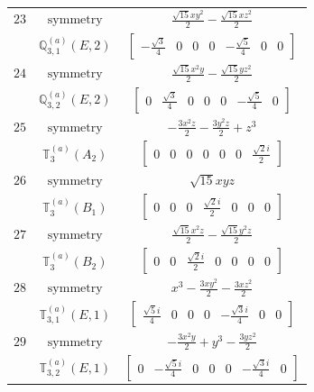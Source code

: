 \documentclass[fleqn,8pt,landscape]{jsarticle}
\begin{document}
\begin{longtable}{ccc}
$ 23 $ & $ \text{symmetry} $ & $ \frac{\sqrt{15} x y^{2}}{2} - \frac{\sqrt{15} x z^{2}}{2} $ \\
$  $ & $ \mathbb{Q}_{3,1}^{(a)}(E,2) $ & $ \begin{bmatrix} - \frac{\sqrt{3}}{4} & 0 & 0 & 0 & - \frac{\sqrt{5}}{4} & 0 & 0 \end{bmatrix} $ \\ \hline
$ 24 $ & $ \text{symmetry} $ & $ \frac{\sqrt{15} x^{2} y}{2} - \frac{\sqrt{15} y z^{2}}{2} $ \\
$  $ & $ \mathbb{Q}_{3,2}^{(a)}(E,2) $ & $ \begin{bmatrix} 0 & \frac{\sqrt{3}}{4} & 0 & 0 & 0 & - \frac{\sqrt{5}}{4} & 0 \end{bmatrix} $ \\ \hline
$ 25 $ & $ \text{symmetry} $ & $ - \frac{3 x^{2} z}{2} - \frac{3 y^{2} z}{2} + z^{3} $ \\
$  $ & $ \mathbb{T}_{3}^{(a)}(A_{2}) $ & $ \begin{bmatrix} 0 & 0 & 0 & 0 & 0 & 0 & \frac{\sqrt{2} i}{2} \end{bmatrix} $ \\ \hline
$ 26 $ & $ \text{symmetry} $ & $ \sqrt{15} x y z $ \\
$  $ & $ \mathbb{T}_{3}^{(a)}(B_{1}) $ & $ \begin{bmatrix} 0 & 0 & 0 & \frac{\sqrt{2} i}{2} & 0 & 0 & 0 \end{bmatrix} $ \\ \hline
$ 27 $ & $ \text{symmetry} $ & $ \frac{\sqrt{15} x^{2} z}{2} - \frac{\sqrt{15} y^{2} z}{2} $ \\
$  $ & $ \mathbb{T}_{3}^{(a)}(B_{2}) $ & $ \begin{bmatrix} 0 & 0 & \frac{\sqrt{2} i}{2} & 0 & 0 & 0 & 0 \end{bmatrix} $ \\ \hline
$ 28 $ & $ \text{symmetry} $ & $ x^{3} - \frac{3 x y^{2}}{2} - \frac{3 x z^{2}}{2} $ \\
$  $ & $ \mathbb{T}_{3,1}^{(a)}(E,1) $ & $ \begin{bmatrix} \frac{\sqrt{5} i}{4} & 0 & 0 & 0 & - \frac{\sqrt{3} i}{4} & 0 & 0 \end{bmatrix} $ \\ \hline
$ 29 $ & $ \text{symmetry} $ & $ - \frac{3 x^{2} y}{2} + y^{3} - \frac{3 y z^{2}}{2} $ \\
$  $ & $ \mathbb{T}_{3,2}^{(a)}(E,1) $ & $ \begin{bmatrix} 0 & - \frac{\sqrt{5} i}{4} & 0 & 0 & 0 & - \frac{\sqrt{3} i}{4} & 0 \end{bmatrix} $ \\ \hline

\end{longtable}
\end{document}
